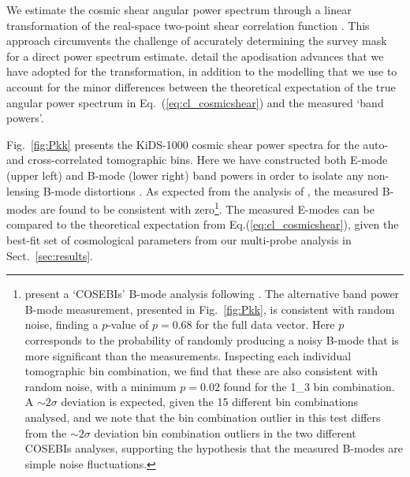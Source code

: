 We estimate the cosmic shear angular power spectrum through a linear transformation of the real-space two-point shear correlation function \citep{schneider/etal:2002}.  This approach circumvents the challenge of accurately determining the survey mask for a direct power spectrum estimate.  \citet{joachimi/etal:inprep} detail the apodisation advances that we have adopted for the transformation, in addition to the modelling that we use to account for the minor differences between the theoretical expectation of the true angular power spectrum in Eq.~(\ref{eq:cl_cosmicshear}) and the measured `band powers'.    
 
Fig.~\ref{fig:Pkk} presents the \citet{asgari/etal:inprep} KiDS-1000 cosmic shear power spectra for the auto- and cross-correlated tomographic bins.   Here we have constructed both E-mode (upper left) and B-mode (lower right) band powers in order to isolate any non-lensing B-mode distortions \citep[see equations 17 to 21 of][]{joachimi/etal:inprep}.     As expected from the analysis of \citet{giblin/etal:inprep}, the measured B-modes are found to be consistent with zero\footnote{\citet{giblin/etal:inprep} present a `COSEBIs' B-mode analysis following \citet{asgari/etal:2019}.  The alternative band power B-mode measurement, presented in Fig.~\ref{fig:Pkk}, is consistent with random noise, finding a $p$-value of $p=0.68$ for the full data vector.  Here $p$ corresponds to the probability of randomly producing a noisy B-mode that is more significant than the measurements.  Inspecting each individual tomographic bin combination, we find that these are also consistent with random noise, with a minimum $p=0.02$ found for the 1{\_}3 bin combination.   A $\sim 2\sigma$ deviation is expected, given the 15 different bin combinations analysed, and we note that the bin combination outlier in this test differs from the $\sim 2\sigma$ deviation bin combination outliers in the two different COSEBIs analyses, supporting the hypothesis that the measured B-modes are simple noise fluctuations.}.   The measured E-modes can be compared to the theoretical expectation from Eq.(\ref{eq:cl_cosmicshear}), given the best-fit set of cosmological parameters from our multi-probe analysis in Sect.~\ref{sec:results}.

